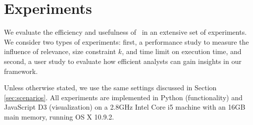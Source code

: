 \section{Experiments}
\label{sec:exp}
We evaluate the efficiency and usefulness of \framework\ in an extensive set of experiments. We consider two types of experiments: first, a performance study to measure the influence of relevance, size constraint $k$, and time limit on execution time, and second, a user study to evaluate how efficient analysts can gain insights in our framework.

\vspace{5pt}
 Unless otherwise stated, we use the same settings discussed in Section \ref{sec:scenarios}. All experiments are implemented in Python (functionality) and JavaScript D3 (visualization) on a 2.8GHz Intel Core i5 machine with an 16GB main memory, running OS X 10.9.2.


